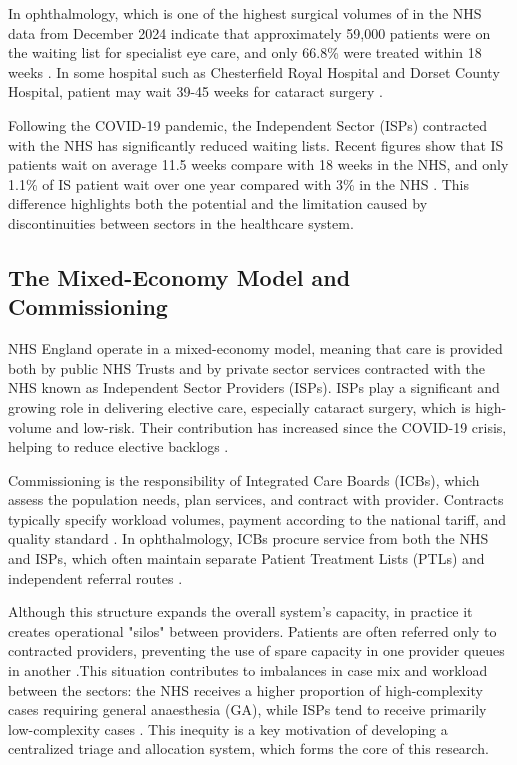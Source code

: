 \documentclass[ %
                    author={Nattanan Nawakitbamrung},
                supervisor={Dr. Sébastien Rochat},
                    degree={MSc},
                     title={Developing and Evaluating the Impact of a Single Patient Treatment List (PTL) for an NHS Integrated Care System},
                  subtitle={},
                      type={},
                      year={2025}]{dissertation}
\begin{document}
\vspace{0.2cm}
In ophthalmology, which is one of the highest surgical volumes of in the NHS data from December 2024 indicate that approximately 59,000 patients were on the waiting list for specialist eye care, and only 66.8\% were treated within 18 weeks \cite{healthwatch2025strain}. In some hospital such as Chesterfield Royal Hospital and Dorset County Hospital, patient may wait 39-45 weeks for cataract surgery \cite{practiceplus2025waiting}.

\vspace{0.2cm}
Following the COVID-19 pandemic, the Independent Sector (ISPs) contracted with the NHS has significantly reduced waiting lists. Recent figures show that IS patients wait on average 11.5 weeks compare with 18 weeks in the NHS, and only 1.1\% of IS patient wait over one year compared with 3\% in the NHS \cite{ihpn2025stats}. This difference highlights both the potential and the limitation caused by discontinuities between sectors in the healthcare system.

\subsection{The Mixed-Economy Model and Commissioning}
NHS England operate in a mixed-economy model, meaning that care is provided both by public NHS Trusts and by private sector services contracted with the NHS known as Independent Sector Providers (ISPs). ISPs play a significant and growing role in delivering elective care, especially cataract surgery, which is high-volume and low-risk. Their contribution has increased since the COVID-19 crisis, helping to reduce elective backlogs \cite{ihpn2025stats, kingsfund2023backlog}.

\vspace{0.2cm}
Commissioning is the responsibility of Integrated Care Boards (ICBs), which assess the population needs, plan services, and contract with provider. Contracts typically specify  workload volumes, payment according to the national tariff, and quality standard \cite{nhs2022elective}. In ophthalmology, ICBs procure service from both the NHS and ISPs, which often maintain separate Patient Treatment Lists (PTLs) and independent referral routes \cite{kingsfund2023backlog}.

\vspace{0.2cm}
Although this structure expands the overall system's capacity, in practice it creates operational "silos" between providers. Patients are often referred only to contracted providers, preventing the use of spare capacity in one provider queues in another \cite{ifs2024past}.This situation contributes to imbalances in case mix and workload between the sectors: the NHS receives a higher proportion of high-complexity cases requiring general anaesthesia (GA), while ISPs tend to receive primarily low-complexity cases \cite{healthwatch2025strain, rcophth2021audit}. This inequity is a key motivation of developing a centralized triage and allocation system, which forms the core of this research.
\end{document}
